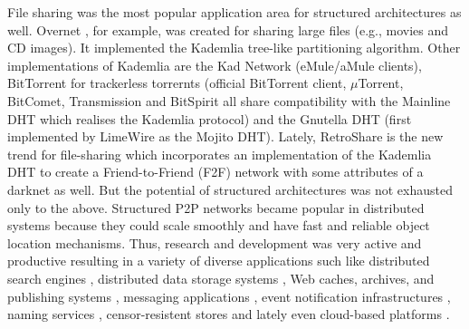 \documentclass[acmcsur,acmnow]{acmtrans2m}
\begin{document}
File sharing was the most popular application area for structured architectures as well. Overnet
\cite{},
for example, was created for sharing large files (e.g., movies and CD images). It implemented the Kademlia tree-like partitioning algorithm. Other implementations of Kademlia are the Kad Network (eMule/aMule  clients), BitTorrent for trackerless torrernts (official BitTorrent client, $\mu$Torrent, BitComet, Transmission and BitSpirit all share compatibility with the Mainline DHT which realises the Kademlia protocol) and the Gnutella DHT (first implemented by LimeWire as the Mojito DHT). Lately, RetroShare \cite{retroshare} is the new trend for file-sharing which incorporates an implementation of the Kademlia DHT to create a Friend-to-Friend (F2F) network with some attributes of a darknet as well. But the potential of structured architectures was not exhausted only to the above. Structured P2P networks became popular in distributed systems because they could scale smoothly and have fast and reliable object location mechanisms. Thus, research and development was very active and productive resulting in a variety of diverse applications such like distributed search engines \cite{yaci}, distributed data storage systems \cite{kbc_oceanstore_2000, bdet_fsdfs_2000, dkkms_cfs_2001, dr_pastutility_2001, abc_farsite_2002, mmfc_ivy_2002, arla, agebh_dks_2003}, Web caches, archives, and publishing systems \cite{ird_squirrel_2002, bags_youserv_2002, wrc_publius_2000, wm_tangler_2001}, messaging applications \cite{threedegrees}, event notification infrastructures \cite{rkcd_scribe_2001, cdkr_scribe_2002, agebh_dks_2003}, naming services \cite{cmm_chorddns_2002}, censor-resistent stores \cite{cswh_freenet_2001} and lately even cloud-based platforms \cite{mgpj_cloudsnap_2011}.


\end{document}

